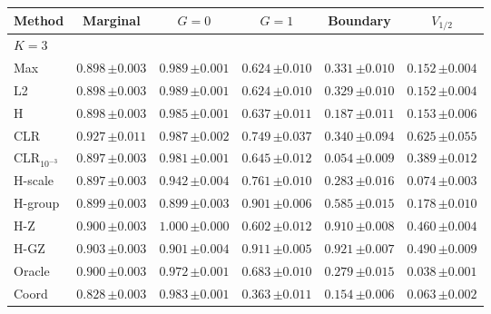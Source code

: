 \begin{tabular}{lccccc}\toprule
Method & Marginal & $G=0$ & $G=1$ & Boundary & $V_{1/2}$ \\\midrule
\multicolumn{6}{l}{$K=3$} \\
Max & $0.898\,{\scriptstyle\pm 0.003}$ & $0.989\,{\scriptstyle\pm 0.001}$ & $0.624\,{\scriptstyle\pm 0.010}$ & $0.331\,{\scriptstyle\pm 0.010}$ & $0.152\,{\scriptstyle\pm 0.004}$ \\
L2 & $0.898\,{\scriptstyle\pm 0.003}$ & $0.989\,{\scriptstyle\pm 0.001}$ & $0.624\,{\scriptstyle\pm 0.010}$ & $0.329\,{\scriptstyle\pm 0.010}$ & $0.152\,{\scriptstyle\pm 0.004}$ \\
H & $0.898\,{\scriptstyle\pm 0.003}$ & $0.985\,{\scriptstyle\pm 0.001}$ & $0.637\,{\scriptstyle\pm 0.011}$ & $0.187\,{\scriptstyle\pm 0.011}$ & $0.153\,{\scriptstyle\pm 0.006}$ \\
CLR & $0.927\,{\scriptstyle\pm 0.011}$ & $0.987\,{\scriptstyle\pm 0.002}$ & $0.749\,{\scriptstyle\pm 0.037}$ & $0.340\,{\scriptstyle\pm 0.094}$ & $0.625\,{\scriptstyle\pm 0.055}$ \\
CLR$_{10^{-3}}$ & $0.897\,{\scriptstyle\pm 0.003}$ & $0.981\,{\scriptstyle\pm 0.001}$ & $0.645\,{\scriptstyle\pm 0.012}$ & $0.054\,{\scriptstyle\pm 0.009}$ & $0.389\,{\scriptstyle\pm 0.012}$ \\
H-scale & $0.897\,{\scriptstyle\pm 0.003}$ & $0.942\,{\scriptstyle\pm 0.004}$ & $0.761\,{\scriptstyle\pm 0.010}$ & $0.283\,{\scriptstyle\pm 0.016}$ & $0.074\,{\scriptstyle\pm 0.003}$ \\
H-group & $0.899\,{\scriptstyle\pm 0.003}$ & $0.899\,{\scriptstyle\pm 0.003}$ & $0.901\,{\scriptstyle\pm 0.006}$ & $0.585\,{\scriptstyle\pm 0.015}$ & $0.178\,{\scriptstyle\pm 0.010}$ \\
H-Z & $0.900\,{\scriptstyle\pm 0.003}$ & $1.000\,{\scriptstyle\pm 0.000}$ & $0.602\,{\scriptstyle\pm 0.012}$ & $0.910\,{\scriptstyle\pm 0.008}$ & $0.460\,{\scriptstyle\pm 0.004}$ \\
H-GZ & $0.903\,{\scriptstyle\pm 0.003}$ & $0.901\,{\scriptstyle\pm 0.004}$ & $0.911\,{\scriptstyle\pm 0.005}$ & $0.921\,{\scriptstyle\pm 0.007}$ & $0.490\,{\scriptstyle\pm 0.009}$ \\
Oracle & $0.900\,{\scriptstyle\pm 0.003}$ & $0.972\,{\scriptstyle\pm 0.001}$ & $0.683\,{\scriptstyle\pm 0.010}$ & $0.279\,{\scriptstyle\pm 0.015}$ & $0.038\,{\scriptstyle\pm 0.001}$ \\
Coord & $0.828\,{\scriptstyle\pm 0.003}$ & $0.983\,{\scriptstyle\pm 0.001}$ & $0.363\,{\scriptstyle\pm 0.011}$ & $0.154\,{\scriptstyle\pm 0.006}$ & $0.063\,{\scriptstyle\pm 0.002}$ \\

\end{tabular}
